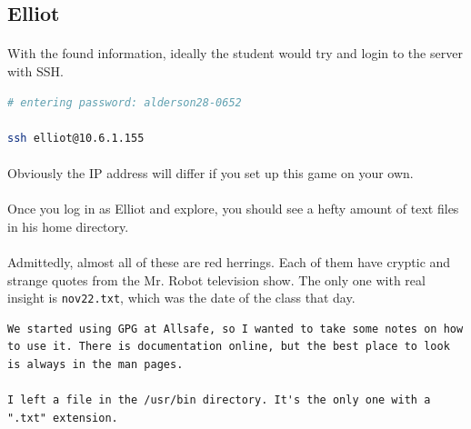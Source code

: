 \documentclass[11pt]{article}
\begin{document}
	\newpage

	\subsection{Elliot}

	\paragraph{} With the found information, ideally the student would try and login to the server with SSH.

	\begin{lstlisting}[language=Bash]
# entering password: alderson28-0652

ssh elliot@10.6.1.155
\end{lstlisting}

	\paragraph{} Obviously the IP address will differ if you set up this game on your own.

	\paragraph{} Once you log in as Elliot and explore, you should see a hefty amount of text files in his home directory.

		\begin{center}
		\graphicspath{ {.} }
		\centering
	\end{center}		

	\paragraph{} Admittedly, almost all of these are red herrings. Each of them have cryptic and strange quotes from the Mr. Robot television show. The only one with real insight is \texttt{nov22.txt}, which was the date of the class that day. \\

	\begin{lstlisting}[]
We started using GPG at Allsafe, so I wanted to take some notes on how to use it. There is documentation online, but the best place to look is always in the man pages.

I left a file in the /usr/bin directory. It's the only one with a ".txt" extension.
\end{lstlisting}
\end{document}
